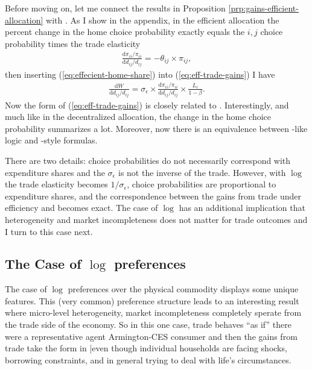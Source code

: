 \documentclass[12pt,pdftex]{article}
\begin{document}
\begin{onehalfspacing}
Before moving on, let me connect the results in Proposition \ref{prp:gains-efficient-allocation} with \citet{arkolakis2012new}. As I show in the appendix, in the efficient allocation the percent change in the home choice probability exactly equals the $i, j$ choice probability times the trade elasticity
\begin{align}
\frac{\mathrm{d} \pi_{ii} / \pi_{ii}}{\mathrm{d} d_{ij} / d_{ij}} = -\theta_{ij} \times \pi_{ij},
\label{eq:effecient-home-share}
\end{align}
then inserting (\ref{eq:effecient-home-share}) into  (\ref{eq:eff-trade-gains}) I have
\begin{align}
\frac{\mathrm{d} W}{\mathrm{d} d_{ij} / d_{ij}} =  \sigma_{\epsilon} \times \frac{\mathrm{d} \pi_{ii} / \pi_{ii}}{\mathrm{d} d_{ij} / d_{ij}} \times \frac{L_i}{1 - \beta}.
\label{eq:eff-trade-gains}
\end{align}
Now the form of (\ref{eq:eff-trade-gains}) is closely related to \citet{arkolakis2012new}. Interestingly, and much like in the decentralized allocation, the change in the home choice probability summarizes a lot. Moreover, now there is an equivalence between \citet{AtkesonBurstein2010}-like logic and \citet{arkolakis2012new}-style formulas.

There are two details: choice probabilities do not necessarily correspond with expenditure shares and the $\sigma_{\epsilon}$ is not the inverse of the trade. However, with $\log$ the trade elasticity becomes $1 / \sigma_{\epsilon}$, choice probabilities are proportional to expenditure shares, and the correspondence between the gains from trade under efficiency and \citet{arkolakis2012new} becomes exact. The case of $\log$ has an additional implication that heterogeneity and market incompleteness does not matter for trade outcomes and I turn to this case next.

\subsection{The Case of $\log$ preferences}\label{sec:log-preferences}

The case of $\log$ preferences over the physical commodity displays some unique features. This (very common) preference structure leads to an interesting result where micro-level heterogeneity, market incompleteness completely sperate from the trade side of the economy. So in this one case, trade behaves ``as if'' there were a representative agent Armington-CES consumer and then the gains from trade take the form in \citet{arkolakis2012new}|even though individual households are facing shocks, borrowing constraints, and in general trying to deal with life's circumstances.


\end{onehalfspacing}
\end{document}
